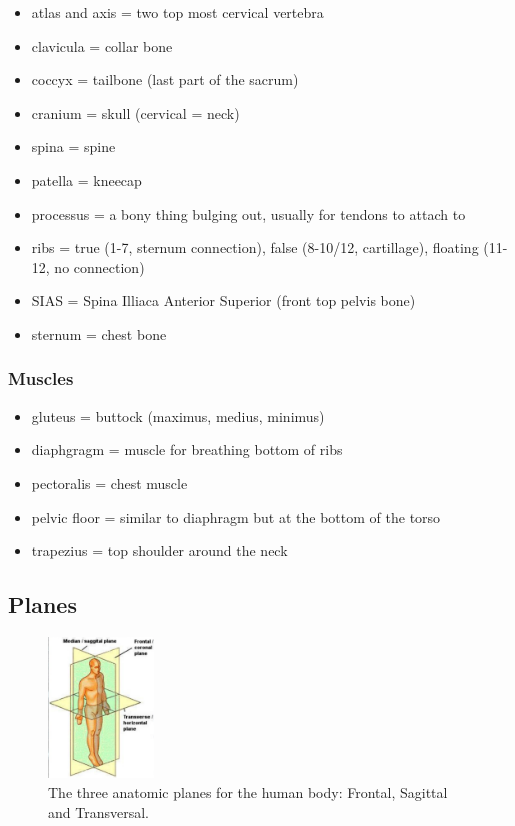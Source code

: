 \begin{itemize}
    \setlength\itemsep{0em}
    \item atlas and axis = two top most cervical vertebra
    \item clavicula = collar bone
    \item coccyx = tailbone (last part of the sacrum)
    \item cranium = skull (cervical = neck)
    \item spina = spine
    \item patella = kneecap
    \item processus = a bony thing bulging out, usually for tendons to attach to
    \item ribs = true (1-7, sternum connection), false (8-10/12, cartillage), floating (11-12, no connection)
    \item SIAS = Spina Illiaca Anterior Superior (front top pelvis bone)
    \item sternum = chest bone
\end{itemize}

\subsubsection{Muscles}

\begin{itemize}
    \setlength\itemsep{0em}
    \item gluteus = buttock (maximus, medius, minimus)
    \item diaphgragm = muscle for breathing bottom of ribs
    \item pectoralis = chest muscle
    \item pelvic floor = similar to diaphragm but at the bottom of the torso
    \item trapezius = top shoulder around the neck
\end{itemize}

\subsection{Planes}\label{subsec:planes}

\begin{figure}
    \centering
    \includegraphics[width=0.25\textwidth]{images/anatomy_planes}
    \caption{The three anatomic planes for the human body: Frontal, Sagittal and Transversal.}
\end{figure}

